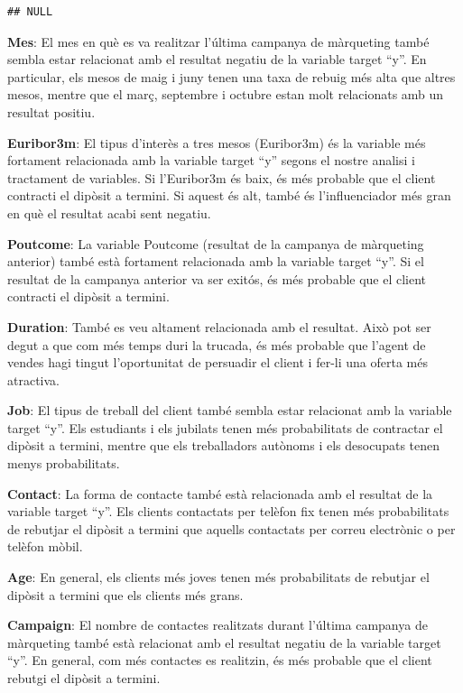 \documentclass[
]{article}
\begin{document}
\begin{verbatim}
## NULL
\end{verbatim}

\textbf{Mes}: El mes en què es va realitzar l'última campanya de
màrqueting també sembla estar relacionat amb el resultat negatiu de la
variable target ``y''. En particular, els mesos de maig i juny tenen una
taxa de rebuig més alta que altres mesos, mentre que el març, septembre
i octubre estan molt relacionats amb un resultat positiu.

\textbf{Euribor3m}: El tipus d'interès a tres mesos (Euribor3m) és la
variable més fortament relacionada amb la variable target ``y'' segons
el nostre analisi i tractament de variables. Si l'Euribor3m és baix, és
més probable que el client contracti el dipòsit a termini. Si aquest és
alt, també és l'influenciador més gran en què el resultat acabi sent
negatiu.

\textbf{Poutcome}: La variable Poutcome (resultat de la campanya de
màrqueting anterior) també està fortament relacionada amb la variable
target ``y''. Si el resultat de la campanya anterior va ser exitós, és
més probable que el client contracti el dipòsit a termini.

\textbf{Duration}: També es veu altament relacionada amb el resultat.
Això pot ser degut a que com més temps duri la trucada, és més probable
que l'agent de vendes hagi tingut l'oportunitat de persuadir el client i
fer-li una oferta més atractiva.

\textbf{Job}: El tipus de treball del client també sembla estar
relacionat amb la variable target ``y''. Els estudiants i els jubilats
tenen més probabilitats de contractar el dipòsit a termini, mentre que
els treballadors autònoms i els desocupats tenen menys probabilitats.

\textbf{Contact}: La forma de contacte també està relacionada amb el
resultat de la variable target ``y''. Els clients contactats per telèfon
fix tenen més probabilitats de rebutjar el dipòsit a termini que aquells
contactats per correu electrònic o per telèfon mòbil.

\textbf{Age}: En general, els clients més joves tenen més probabilitats
de rebutjar el dipòsit a termini que els clients més grans.

\textbf{Campaign}: El nombre de contactes realitzats durant l'última
campanya de màrqueting també està relacionat amb el resultat negatiu de
la variable target ``y''. En general, com més contactes es realitzin, és
més probable que el client rebutgi el dipòsit a termini.
\end{document}
